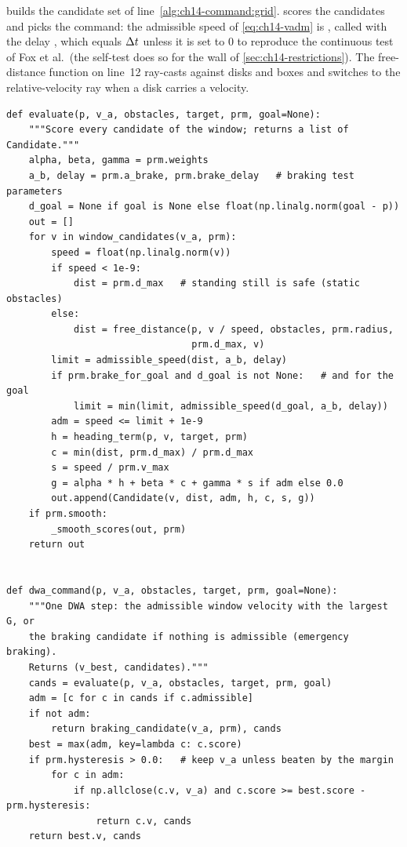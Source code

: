  builds the candidate set of
line~\ref{alg:ch14-command:grid}.
 scores the candidates and picks the command: the
admissible speed of \cref{eq:ch14-vadm} is , called with the delay , which equals
$\Delta t$ unless it is set to $0$ to reproduce the continuous test of Fox et al.\
(the self-test does so for the wall of \cref{sec:ch14-restrictions}). The
free-distance function on line~12 ray-casts against disks and boxes and
switches to the relative-velocity ray when a disk carries a velocity.

\begin{lstlisting}[caption={Scoring and selection (from \code{code/ch14\_dwa.py}).},label={lst:ch14-dist}]
def evaluate(p, v_a, obstacles, target, prm, goal=None):
    """Score every candidate of the window; returns a list of Candidate."""
    alpha, beta, gamma = prm.weights
    a_b, delay = prm.a_brake, prm.brake_delay   # braking test parameters
    d_goal = None if goal is None else float(np.linalg.norm(goal - p))
    out = []
    for v in window_candidates(v_a, prm):
        speed = float(np.linalg.norm(v))
        if speed < 1e-9:
            dist = prm.d_max   # standing still is safe (static obstacles)
        else:
            dist = free_distance(p, v / speed, obstacles, prm.radius,
                                 prm.d_max, v)
        limit = admissible_speed(dist, a_b, delay)
        if prm.brake_for_goal and d_goal is not None:   # and for the goal
            limit = min(limit, admissible_speed(d_goal, a_b, delay))
        adm = speed <= limit + 1e-9
        h = heading_term(p, v, target, prm)
        c = min(dist, prm.d_max) / prm.d_max
        s = speed / prm.v_max
        g = alpha * h + beta * c + gamma * s if adm else 0.0
        out.append(Candidate(v, dist, adm, h, c, s, g))
    if prm.smooth:
        _smooth_scores(out, prm)
    return out


def dwa_command(p, v_a, obstacles, target, prm, goal=None):
    """One DWA step: the admissible window velocity with the largest G, or
    the braking candidate if nothing is admissible (emergency braking).
    Returns (v_best, candidates)."""
    cands = evaluate(p, v_a, obstacles, target, prm, goal)
    adm = [c for c in cands if c.admissible]
    if not adm:
        return braking_candidate(v_a, prm), cands
    best = max(adm, key=lambda c: c.score)
    if prm.hysteresis > 0.0:   # keep v_a unless beaten by the margin
        for c in adm:
            if np.allclose(c.v, v_a) and c.score >= best.score - prm.hysteresis:
                return c.v, cands
    return best.v, cands
\end{lstlisting}

